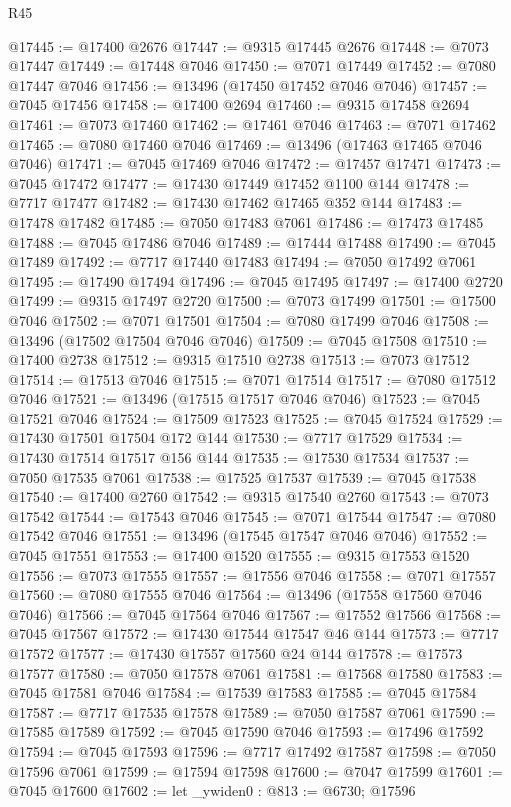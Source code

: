 \begin{lexlean}{R45}
\begin{coremodule}
{@17445 := @17400 @2676
@17447 := @9315 @17445 @2676
@17448 := @7073 @17447
@17449 := @17448 @7046
@17450 := @7071 @17449
@17452 := @7080 @17447 @7046
@17456 := @13496 (@17450 @17452 @7046 @7046)
@17457 := @7045 @17456
@17458 := @17400 @2694
@17460 := @9315 @17458 @2694
@17461 := @7073 @17460
@17462 := @17461 @7046
@17463 := @7071 @17462
@17465 := @7080 @17460 @7046
@17469 := @13496 (@17463 @17465 @7046 @7046)
@17471 := @7045 @17469 @7046
@17472 := @17457 @17471
@17473 := @7045 @17472
@17477 := @17430 @17449 @17452 @1100 @144
@17478 := @7717 @17477
@17482 := @17430 @17462 @17465 @352 @144
@17483 := @17478 @17482
@17485 := @7050 @17483 @7061
@17486 := @17473 @17485
@17488 := @7045 @17486 @7046
@17489 := @17444 @17488
@17490 := @7045 @17489
@17492 := @7717 @17440 @17483
@17494 := @7050 @17492 @7061
@17495 := @17490 @17494
@17496 := @7045 @17495
@17497 := @17400 @2720
@17499 := @9315 @17497 @2720
@17500 := @7073 @17499
@17501 := @17500 @7046
@17502 := @7071 @17501
@17504 := @7080 @17499 @7046
@17508 := @13496 (@17502 @17504 @7046 @7046)
@17509 := @7045 @17508
@17510 := @17400 @2738
@17512 := @9315 @17510 @2738
@17513 := @7073 @17512
@17514 := @17513 @7046
@17515 := @7071 @17514
@17517 := @7080 @17512 @7046
@17521 := @13496 (@17515 @17517 @7046 @7046)
@17523 := @7045 @17521 @7046
@17524 := @17509 @17523
@17525 := @7045 @17524
@17529 := @17430 @17501 @17504 @172 @144
@17530 := @7717 @17529
@17534 := @17430 @17514 @17517 @156 @144
@17535 := @17530 @17534
@17537 := @7050 @17535 @7061
@17538 := @17525 @17537
@17539 := @7045 @17538
@17540 := @17400 @2760
@17542 := @9315 @17540 @2760
@17543 := @7073 @17542
@17544 := @17543 @7046
@17545 := @7071 @17544
@17547 := @7080 @17542 @7046
@17551 := @13496 (@17545 @17547 @7046 @7046)
@17552 := @7045 @17551
@17553 := @17400 @1520
@17555 := @9315 @17553 @1520
@17556 := @7073 @17555
@17557 := @17556 @7046
@17558 := @7071 @17557
@17560 := @7080 @17555 @7046
@17564 := @13496 (@17558 @17560 @7046 @7046)
@17566 := @7045 @17564 @7046
@17567 := @17552 @17566
@17568 := @7045 @17567
@17572 := @17430 @17544 @17547 @46 @144
@17573 := @7717 @17572
@17577 := @17430 @17557 @17560 @24 @144
@17578 := @17573 @17577
@17580 := @7050 @17578 @7061
@17581 := @17568 @17580
@17583 := @7045 @17581 @7046
@17584 := @17539 @17583
@17585 := @7045 @17584
@17587 := @7717 @17535 @17578
@17589 := @7050 @17587 @7061
@17590 := @17585 @17589
@17592 := @7045 @17590 @7046
@17593 := @17496 @17592
@17594 := @7045 @17593
@17596 := @7717 @17492 @17587
@17598 := @7050 @17596 @7061
@17599 := @17594 @17598
@17600 := @7047 @17599
@17601 := @7045 @17600
@17602 := let _ywiden0 : @813 := @6730; @17596
}
\end{coremodule}
\end{lexlean}
